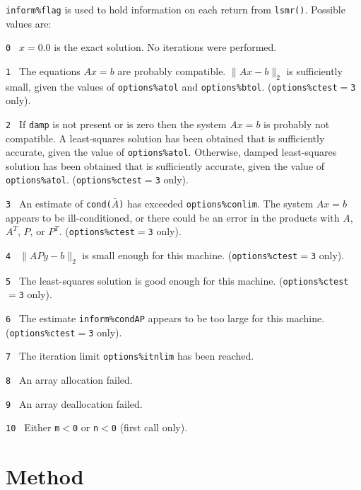 {\tt inform\%flag} is used to hold
   information on each return from {\tt lsmr()}. 
Possible values are:
\begin{description}
\item{\tt 0 }  $x = 0.0$  is the exact solution.
               No iterations were performed.
\item{\tt 1 }  The equations $Ax = b$ are probably compatible.
               $\|Ax - b\|_2$ is sufficiently small, given the
               values of {\tt options\%atol} and {\tt options\%btol}. 
               ({\tt options\%ctest}$ = ${\tt 3} only). 
\item{\tt 2 }  If {\tt damp} is not present or is zero then the system $Ax = b$
               is probably not compatible.  A least-squares solution has been
               obtained that is sufficiently accurate, given the value of
               {\tt options\%atol}.  
               Otherwise, damped least-squares solution has been obtained that
               is sufficiently accurate, given the value of {\tt options\%atol}.
               ({\tt options\%ctest}$ = ${\tt 3} only). 
\item{\tt 3 }  An estimate of {\tt cond($\bar{A}$)} has exceeded
               {\tt options\%conlim}. The system $Ax = b$ appears to be
               ill-conditioned, or there could be an error in the products 
               with $A$, $A^T$, $P$, or $P^T$. ({\tt options\%ctest}$ = ${\tt 3}
               only). 
\item{\tt 4 }  $\|APy - b \|_2$ is small enough for this machine.
               ({\tt options\%ctest}$ = ${\tt 3} only). 
\item{\tt 5 }  The least-squares solution is good enough for this
               machine. ({\tt options\%ctest}$ = ${\tt 3} only). 
\item{\tt 6 }  The estimate {\tt inform\%condAP} appears to be too large 
               for this machine.         
               ({\tt options\%ctest}$ = ${\tt 3} only). 
\item{\tt 7 }  The iteration limit {\tt options\%itnlim} has been reached. 
\item{\tt 8 }  An array allocation failed.
\item{\tt 9 }  An array deallocation failed.
\item{\tt 10 } Either  {\tt m$<$0} or {\tt n$<$0} (first call only).

\end{description}

\section{Method} \label{method}

